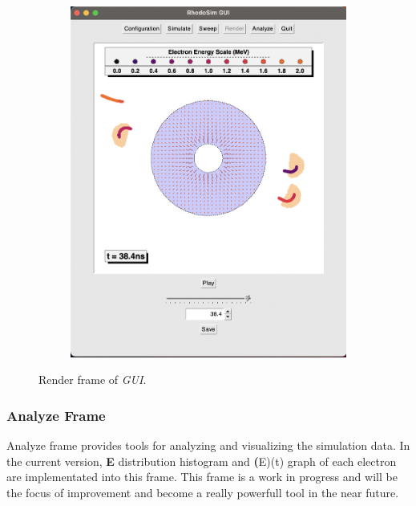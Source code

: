 \documentclass[a4paper,oneside,12pt]{report}
\numberwithin{equation}{chapter}
\begin{document}
\begin{figure}
\begin{subfigure}{0.8\textwidth}
        \includegraphics[width=\linewidth]{./figures/rhodoSim/GUI_render_frame_2.png}
    \end{subfigure} 
    \caption{Render frame of \textit{GUI}.}
    \label{fig:gui_render_1}
\end{figure}

\subsubsection{Analyze Frame}
Analyze frame provides tools for analyzing and visualizing the simulation data. 
In the current version, \textbf{E} distribution histogram and \textbf(E)(t) graph of each electron are implementated into this frame.
This frame is a work in progress and will be the focus of improvement and become a really powerfull tool in the near future.
\end{document}
